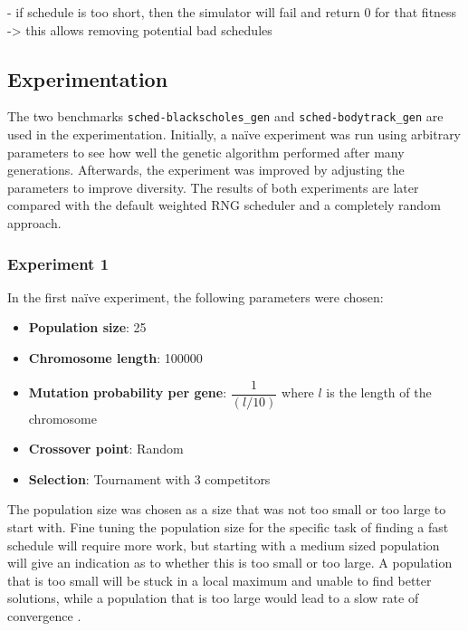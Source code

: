 \documentclass{article}
\begin{document}
- if schedule is too short, then the simulator will fail and return 0 for that fitness -> this allows removing potential bad schedules

\subsection{Experimentation}
The two benchmarks \texttt{sched-blackscholes_gen} and \texttt{sched-bodytrack_gen} are used in the experimentation. Initially, a na\"{i}ve experiment was run using arbitrary parameters to see how well the genetic algorithm performed after many generations. Afterwards, the experiment was improved by adjusting the parameters to improve diversity. The results of both experiments are later compared with the default weighted RNG scheduler and a completely random approach. 
\subsubsection{Experiment 1}
In the first na\"{i}ve experiment, the following parameters were chosen:
\begin{itemize}
\item \textbf{Population size}: 25
\item \textbf{Chromosome length}: 100000
\item \textbf{Mutation probability per gene}: $\dfrac{1}{(l/10)}$ where $l$ is the length of the chromosome
\item \textbf{Crossover point}: Random
\item \textbf{Selection}: Tournament with 3 competitors
\end{itemize}
The population size was chosen as a size that was not too small or too large to start with. Fine tuning the population size for the specific task of finding a fast schedule will require more work, but starting with a medium sized population will give an indication as to whether this is too small or too large. A population that is too small will be stuck in a local maximum and unable to find better solutions, while a population that is too large would lead to a slow rate of convergence \cite{ga-size}.
\end{document}
